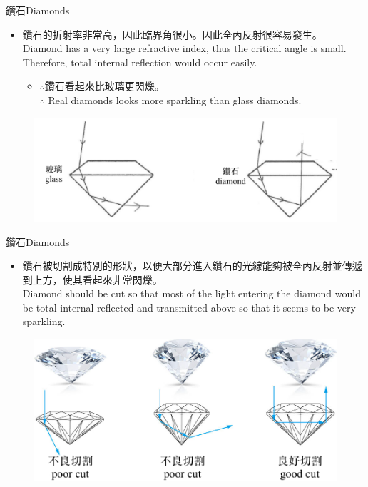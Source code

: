 \documentclass[beamer=true]{standalone}
\begin{document}
\begin{frame}{鑽石Diamonds}
\begin{itemize}
    \item 鑽石的折射率非常高，因此臨界角很小。因此全內反射很容易發生。\\Diamond has a very large refractive index, thus the critical angle is small. Therefore, total internal reflection would occur easily.
    \begin{itemize}
        \item $\therefore$鑽石看起來比玻璃更閃爍。\\$\therefore$ Real diamonds looks more sparkling than glass diamonds.
    \end{itemize}
\end{itemize}
\begin{figure}
    \centering
    \includegraphics[width=0.75\linewidth]{assets/snu892u98du2d982.png}
    
    
\end{figure}

\end{frame}

\begin{frame}{鑽石Diamonds}
\begin{itemize}
    \item 鑽石被切割成特別的形狀，以便大部分進入鑽石的光線能夠被全內反射並傳遞到上方，使其看起來非常閃爍。\\Diamond should be cut so that most of the light entering the diamond would be total internal reflected and transmitted above so that it seems to be very sparkling.
\end{itemize}
    \begin{figure}
        \centering
        \includegraphics[width=0.8\linewidth]{assets/d8n9xudn8392dfr.png}
        
        
    \end{figure}
\end{frame}
\end{document}
